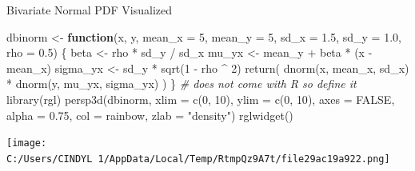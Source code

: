 \documentclass[
  ignorenonframetext,
]{beamer}
\newenvironment{Shaded}{\begin{snugshade}}{\end{snugshade}}
\newcommand{\AttributeTok}[1]{\textcolor[rgb]{0.77,0.63,0.00}{#1}}
\newcommand{\CommentTok}[1]{\textcolor[rgb]{0.56,0.35,0.01}{\textit{#1}}}
\newcommand{\ConstantTok}[1]{\textcolor[rgb]{0.00,0.00,0.00}{#1}}
\newcommand{\ControlFlowTok}[1]{\textcolor[rgb]{0.13,0.29,0.53}{\textbf{#1}}}
\newcommand{\DecValTok}[1]{\textcolor[rgb]{0.00,0.00,0.81}{#1}}
\newcommand{\FloatTok}[1]{\textcolor[rgb]{0.00,0.00,0.81}{#1}}
\newcommand{\FunctionTok}[1]{\textcolor[rgb]{0.00,0.00,0.00}{#1}}
\newcommand{\NormalTok}[1]{#1}
\newcommand{\OtherTok}[1]{\textcolor[rgb]{0.56,0.35,0.01}{#1}}
\newcommand{\SpecialCharTok}[1]{\textcolor[rgb]{0.00,0.00,0.00}{#1}}
\newcommand{\StringTok}[1]{\textcolor[rgb]{0.31,0.60,0.02}{#1}}
\begin{document}
\begin{frame}[fragile]{Bivariate Normal PDF Visualized}
\protect\hypertarget{bivariate-normal-pdf-visualized}{}
\begin{Shaded}
\begin{Highlighting}[]
\NormalTok{dbinorm }\OtherTok{\textless{}{-}} \ControlFlowTok{function}\NormalTok{(x, y, }
                    \AttributeTok{mean\_x =} \DecValTok{5}\NormalTok{, }
                    \AttributeTok{mean\_y =} \DecValTok{5}\NormalTok{, }
                    \AttributeTok{sd\_x =} \FloatTok{1.5}\NormalTok{, }
                    \AttributeTok{sd\_y =} \FloatTok{1.0}\NormalTok{, }
                    \AttributeTok{rho =} \FloatTok{0.5}\NormalTok{) \{}
\NormalTok{  beta }\OtherTok{\textless{}{-}}\NormalTok{ rho }\SpecialCharTok{*}\NormalTok{ sd\_y }\SpecialCharTok{/}\NormalTok{ sd\_x}
\NormalTok{  mu\_yx }\OtherTok{\textless{}{-}}\NormalTok{ mean\_y }\SpecialCharTok{+}\NormalTok{ beta }\SpecialCharTok{*}\NormalTok{ (x }\SpecialCharTok{{-}}\NormalTok{ mean\_x)}
\NormalTok{  sigma\_yx }\OtherTok{\textless{}{-}}\NormalTok{ sd\_y }\SpecialCharTok{*} \FunctionTok{sqrt}\NormalTok{(}\DecValTok{1} \SpecialCharTok{{-}}\NormalTok{ rho }\SpecialCharTok{\^{}} \DecValTok{2}\NormalTok{)}
  \FunctionTok{return}\NormalTok{( }\FunctionTok{dnorm}\NormalTok{(x, mean\_x, sd\_x) }\SpecialCharTok{*} 
          \FunctionTok{dnorm}\NormalTok{(y, mu\_yx, sigma\_yx) )}
\NormalTok{\} }\CommentTok{\# does not come with R so define it}
\FunctionTok{library}\NormalTok{(rgl)}
\FunctionTok{persp3d}\NormalTok{(dbinorm, }\AttributeTok{xlim =} \FunctionTok{c}\NormalTok{(}\DecValTok{0}\NormalTok{, }\DecValTok{10}\NormalTok{), }
        \AttributeTok{ylim =} \FunctionTok{c}\NormalTok{(}\DecValTok{0}\NormalTok{, }\DecValTok{10}\NormalTok{), }\AttributeTok{axes =} \ConstantTok{FALSE}\NormalTok{,}
        \AttributeTok{alpha =} \FloatTok{0.75}\NormalTok{, }\AttributeTok{col =}\NormalTok{ rainbow,}
        \AttributeTok{zlab =} \StringTok{"density"}\NormalTok{)}
\FunctionTok{rglwidget}\NormalTok{()}
\end{Highlighting}
\end{Shaded}

\texttt{[image: C:/Users/CINDYL~1/AppData/Local/Temp/RtmpQz9A7t/file29ac19a922.png]}
\end{frame}
\end{document}
